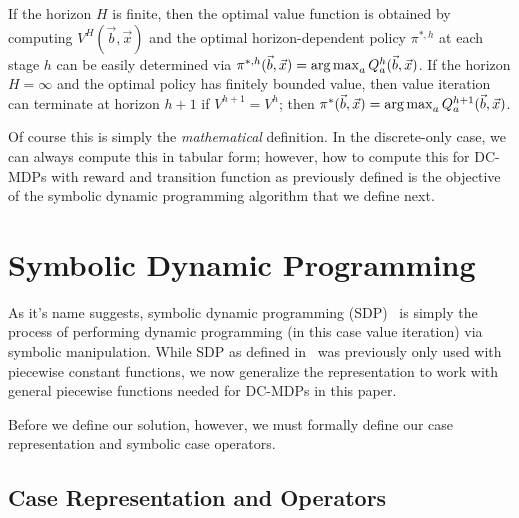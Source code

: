 \documentclass[letterpaper]{article}
\def\argmax{\operatornamewithlimits{arg\,max}}
\begin{document}
If the horizon $H$ is finite, then the optimal value function is
obtained by computing $V^H(\vec{b},\vec{x})$ and the optimal
horizon-dependent policy $\pi^{*,h}$ at each stage $h$ can be easily
determined via 
$\pi^{*,h}(\vec{b},\vec{x}) = \argmax_a Q^h_a(\vec{b},\vec{x})$.  
If the horizon 
$H = \infty$ and the optimal policy has finitely bounded value, 
then value iteration can terminate at horizon $h+1$ if 
$V^{h+1} = V^{h}$; then 
$\pi^*(\vec{b},\vec{x}) = \argmax_a Q^{h+1}_a(\vec{b},\vec{x})$.

Of course this is simply the \emph{mathematical} definition.  In the
discrete-only case, we can always compute this in tabular form;
however, how to compute this for DC-MDPs with reward and transition
function as previously defined is the objective of the symbolic
dynamic programming algorithm that we define next.

\section{Symbolic Dynamic Programming}

As it's name suggests, symbolic dynamic programming (SDP)~\cite{fomdp}
is simply the process of performing dynamic programming (in this case
value iteration) via symbolic manipulation.  While SDP as defined
in~\cite{fomdp} was previously only used with piecewise
constant functions, we now generalize the representation to work with
general piecewise functions needed for DC-MDPs in this paper.  

Before we define our solution, however, we must formally define our
case representation and symbolic case operators.

\subsection{Case Representation and Operators}
\end{document}
